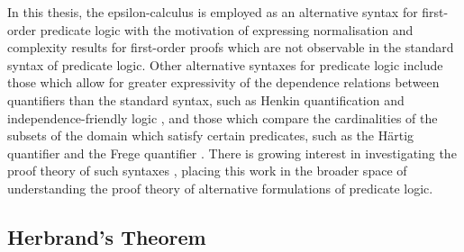 \documentclass[10pt]{article}
\theoremstyle{definition}\newtheorem{remark}[theorem]{Remark}
\theoremstyle{definition}\newtheorem{example}[theorem]{Example}
\theoremstyle{definition}\newtheorem{definition}[theorem]{Definition}
\begin{document}
	In this thesis, the epsilon-calculus is employed as an alternative syntax for first-order predicate logic with the motivation of expressing normalisation and complexity results for first-order proofs which are not observable in the standard syntax of predicate logic. Other alternative syntaxes for predicate logic include those which allow for greater expressivity of the dependence relations between quantifiers than the standard syntax, such as Henkin quantification \cite{HenkinInfinitelyLongFormulas} and independence-friendly logic \cite{HintikkaPrinciplesMathematics}, and those which compare the cardinalities of the subsets of the domain which satisfy certain predicates, such as the Härtig quantifier \cite{HerreHartig} and the Frege quantifier \cite{AntonelliFregeQuantifier}. There is growing interest in investigating the proof theory of such syntaxes \cite{BaazHenkin}, placing this work in the broader space of understanding the proof theory of alternative formulations of predicate logic.
	
	\subsection{Herbrand's Theorem}\label{HerbrandSection}
	
\end{document}
